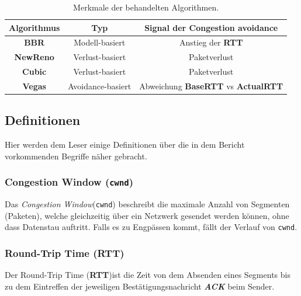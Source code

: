 \documentclass[paper=a4,fontsize=12pt,ngerman]{scrartcl}
\begin{document}
\begin{table}[ht]
    \centering

        \begin{tabular}{c|c|c}

            \hline
            \textbf{Algorithmus} & \textbf{Typ} & \textbf{Signal der Congestion avoidance} \\ \hline

            \textbf{BBR} & Modell-basiert & Anstieg der \textbf{RTT}  \\
            \hline
            \textbf{NewReno} & Verlust-basiert & Paketverlust \\
            \hline
            \textbf{Cubic} & Verlust-basiert  & Paketverlust \\
            \hline
            \textbf{Vegas} & Avoidance-basiert & Abweichung \textbf{BaseRTT} vs \textbf{ActualRTT} \\
            \hline

        \end{tabular}

        \caption{Merkmale der behandelten Algorithmen.}
        \label{tab:algoComp}


\end{table}

\subsection{Definitionen}
Hier werden dem Leser einige Definitionen über die in dem Bericht vorkommenden Begriffe näher gebracht.

\subsubsection{Congestion Window (\texttt{cwnd})} \label{cw-def}
Das \textit{Congestion Window}(\texttt{cwnd}) beschreibt die maximale Anzahl von Segmenten (Paketen), welche gleichzeitig über ein Netzwerk gesendet werden können, ohne 
dass Datenstau auftritt. Falls es zu Engpässen kommt, fällt der Verlauf von \texttt{cwnd}.

\subsubsection{Round-Trip Time (\textbf{RTT})} \label{rtt-def}

Der Round-Trip Time (\textbf{RTT})ist die Zeit von dem Absenden eines Segments bis zu dem Eintreffen der jeweiligen Bestätigungsnachricht \textit{\textbf{ACK}} beim Sender.
\end{document}
